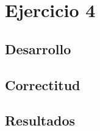 
	\section{Ejercicio 4}

    \subsection{Desarrollo}

    \pagebreak

    \subsection{Correctitud}
	

    \pagebreak


    \subsection{Resultados}

    \pagebreak
